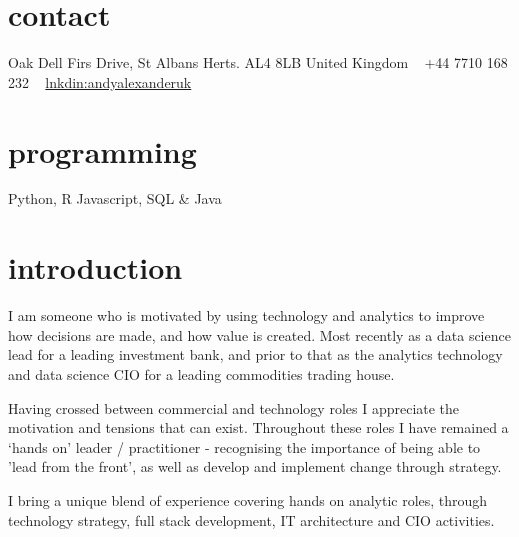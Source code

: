 \documentclass[]{friggeri-cv-a4}
\begin{document}


\begin{aside} %
\section{contact}
Oak Dell
Firs Drive, St Albans
Herts. AL4 8LB
United Kingdom
~
+44 7710 168 232
~
\href{https://www.linkedin.com/in/andyalexanderuk}{lnkdin:andyalexanderuk}
\section{programming}
Python, R
Javascript, SQL \& Java
\end{aside}



\section{introduction}

I am someone who is motivated by using technology and analytics to improve how decisions are made, and how value is created.  Most recently as a data science lead for a leading investment bank, and prior to that as the analytics technology and data science CIO for a leading commodities trading house.

Having crossed between commercial and technology roles I appreciate the motivation and tensions that can exist.  Throughout these roles I have remained a ‘hands on’ leader / practitioner - recognising the importance of being able to 'lead from the front', as well as develop and implement change through strategy.

I bring a unique blend of experience covering hands on analytic roles, through technology strategy, full stack development, IT architecture and CIO activities.  
\end{document}
